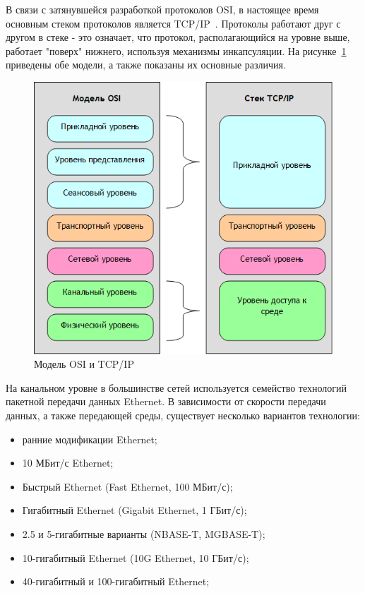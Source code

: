 В связи с затянувшейся разработкой протоколов OSI, в настоящее время основным стеком протоколов является TCP/IP~\cite{modern_net}. Протоколы работают друг с другом в стеке - это означает, что протокол, располагающийся на уровне выше, работает
"поверх" нижнего, используя механизмы инкапсуляции. На рисунке~\ref{pic:model_osi_vs_tcpip} приведены обе модели, а также показаны их основные различия.
\begin{figure}[h]
\centering
\includegraphics[scale=0.5]{pictures/model_osi_vs_tcpip}
\caption{Модель OSI и TCP/IP}
\label{pic:model_osi_vs_tcpip}
\end{figure}

На канальном уровне в большинстве сетей используется семейство технологий пакетной передачи данных Ethernet. В зависимости от скорости передачи данных, а также передающей среды, существует несколько вариантов технологии:
\begin{itemize}
\item ранние модификации Ethernet;
\item 10 МБит/с Ethernet;
\item Быстрый Ethernet (Fast Ethernet, 100 МБит/с);
\item Гигабитный Ethernet (Gigabit Ethernet, 1 ГБит/с);
\item 2.5 и 5-гигабитные варианты (NBASE-T, MGBASE-T);
\item 10-гигабитный Ethernet (10G Ethernet, 10 ГБит/с);
\item 40-гигабитный и 100-гигабитный Ethernet;
\end{itemize}

